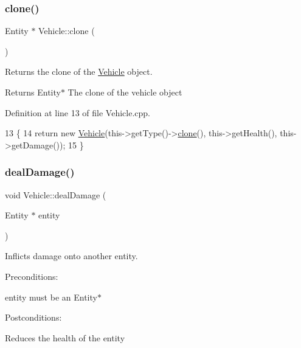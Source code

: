 \subsubsection{\texorpdfstring{clone()}{clone()}}
{\footnotesize\ttfamily Entity $\ast$ Vehicle\+::clone (\begin{DoxyParamCaption}{ }\end{DoxyParamCaption})}



Returns the clone of the \hyperlink{classVehicle}{Vehicle} object. 

\begin{DoxyReturn}{Returns}
Entity$\ast$ The clone of the vehicle object 
\end{DoxyReturn}


Definition at line 13 of file Vehicle.\+cpp.


\begin{DoxyCode}
13                        \{
14     \textcolor{keywordflow}{return} \textcolor{keyword}{new} \hyperlink{classVehicle_a6fb25af1c4f5a69022a64d25308d60e0}{Vehicle}(this->getType()->\hyperlink{classVehicle_a705081c9b479d76cd6113a661d9c8770}{clone}(), this->getHealth(), this->getDamage());
15 \}
\end{DoxyCode}
\mbox{\label{classVehicle_a8a89569fb092d60bbb172ecd0d4ef4d1}} 
\subsubsection{\texorpdfstring{deal\+Damage()}{dealDamage()}}
{\footnotesize\ttfamily void Vehicle\+::deal\+Damage (\begin{DoxyParamCaption}\item[{Entity $\ast$}]{entity }\end{DoxyParamCaption})}



Inflicts damage onto another entity. 

Preconditions\+:
\begin{DoxyItemize}
\item entity must be an Entity$\ast$
\end{DoxyItemize}

Postconditions\+:
\begin{DoxyItemize}
\item Reduces the health of the entity
\end{DoxyItemize}


